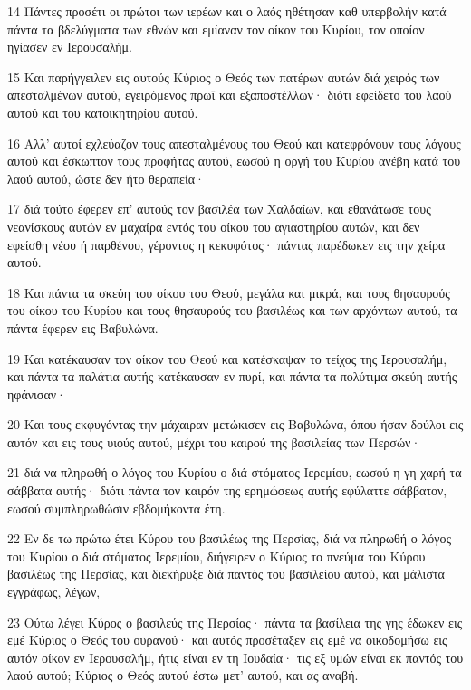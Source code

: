 \par 14 Πάντες προσέτι οι πρώτοι των ιερέων και ο λαός ηθέτησαν καθ υπερβολήν κατά πάντα τα βδελύγματα των εθνών και εμίαναν τον οίκον του Κυρίου, τον οποίον ηγίασεν εν Ιερουσαλήμ.
\par 15 Και παρήγγειλεν εις αυτούς Κύριος ο Θεός των πατέρων αυτών διά χειρός των απεσταλμένων αυτού, εγειρόμενος πρωΐ και εξαποστέλλων· διότι εφείδετο του λαού αυτού και του κατοικητηρίου αυτού.
\par 16 Αλλ' αυτοί εχλεύαζον τους απεσταλμένους του Θεού και κατεφρόνουν τους λόγους αυτού και έσκωπτον τους προφήτας αυτού, εωσού η οργή του Κυρίου ανέβη κατά του λαού αυτού, ώστε δεν ήτο θεραπεία·
\par 17 διά τούτο έφερεν επ' αυτούς τον βασιλέα των Χαλδαίων, και εθανάτωσε τους νεανίσκους αυτών εν μαχαίρα εντός του οίκου του αγιαστηρίου αυτών, και δεν εφείσθη νέου ή παρθένου, γέροντος η κεκυφότος· πάντας παρέδωκεν εις την χείρα αυτού.
\par 18 Και πάντα τα σκεύη του οίκου του Θεού, μεγάλα και μικρά, και τους θησαυρούς του οίκου του Κυρίου και τους θησαυρούς του βασιλέως και των αρχόντων αυτού, τα πάντα έφερεν εις Βαβυλώνα.
\par 19 Και κατέκαυσαν τον οίκον του Θεού και κατέσκαψαν το τείχος της Ιερουσαλήμ, και πάντα τα παλάτια αυτής κατέκαυσαν εν πυρί, και πάντα τα πολύτιμα σκεύη αυτής ηφάνισαν·
\par 20 Και τους εκφυγόντας την μάχαιραν μετώκισεν εις Βαβυλώνα, όπου ήσαν δούλοι εις αυτόν και εις τους υιούς αυτού, μέχρι του καιρού της βασιλείας των Περσών·
\par 21 διά να πληρωθή ο λόγος του Κυρίου ο διά στόματος Ιερεμίου, εωσού η γη χαρή τα σάββατα αυτής· διότι πάντα τον καιρόν της ερημώσεως αυτής εφύλαττε σάββατον, εωσού συμπληρωθώσιν εβδομήκοντα έτη.
\par 22 Εν δε τω πρώτω έτει Κύρου του βασιλέως της Περσίας, διά να πληρωθή ο λόγος του Κυρίου ο διά στόματος Ιερεμίου, διήγειρεν ο Κύριος το πνεύμα του Κύρου βασιλέως της Περσίας, και διεκήρυξε διά παντός του βασιλείου αυτού, και μάλιστα εγγράφως, λέγων,
\par 23 Ούτω λέγει Κύρος ο βασιλεύς της Περσίας· πάντα τα βασίλεια της γης έδωκεν εις εμέ Κύριος ο Θεός του ουρανού· και αυτός προσέταξεν εις εμέ να οικοδομήσω εις αυτόν οίκον εν Ιερουσαλήμ, ήτις είναι εν τη Ιουδαία· τις εξ υμών είναι εκ παντός του λαού αυτού; Κύριος ο Θεός αυτού έστω μετ' αυτού, και ας αναβή.


